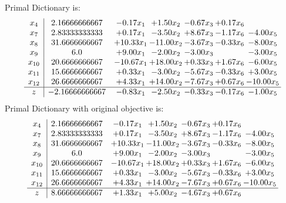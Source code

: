 \documentclass[8pt]{article}
\begin{document}
Primal Dictionary is:
\[\begin{array}{c| c c@{\hskip 2pt} c@{\hskip 2pt} c@{\hskip 2pt} c@{\hskip 2pt} c@{\hskip 2pt} }
 x_{4}   &  2.16666666667 & -0.17 x_{1} & +  1.50 x_{2} & -0.67 x_{3} & +  0.17 x_{6} &   \\
 x_{7}   &  2.83333333333 & +  0.17 x_{1} & -3.50 x_{2} & +  8.67 x_{3} & -1.17 x_{6} & -4.00 x_{5}\\
 x_{8}   &  31.6666666667 & + 10.33 x_{1} & -11.00 x_{2} & -3.67 x_{3} & -0.33 x_{6} & -8.00 x_{5}\\
 x_{9}   &  6.0 & +  9.00 x_{1} & -2.00 x_{2} & -3.00 x_{3} &   & -3.00 x_{5}\\
 x_{10}   &  20.6666666667 & -10.67 x_{1} & + 18.00 x_{2} & +  0.33 x_{3} & +  1.67 x_{6} & -6.00 x_{5}\\
 x_{11}   &  15.6666666667 & +  0.33 x_{1} & -3.00 x_{2} & -5.67 x_{3} & -0.33 x_{6} & +  3.00 x_{5}\\
 x_{12}   &  26.6666666667 & +  4.33 x_{1} & + 14.00 x_{2} & -7.67 x_{3} & +  0.67 x_{6} & -10.00 x_{5}\\
\hline
z    &  -2.16666666667 & -0.83 x_{1} & -2.50 x_{2} & -0.33 x_{3} & -0.17 x_{6} & -1.00 x_{5}\\
\end{array}\]
Primal Dictionary with original objective is:
\[\begin{array}{c| c c@{\hskip 2pt} c@{\hskip 2pt} c@{\hskip 2pt} c@{\hskip 2pt} c@{\hskip 2pt} }
 x_{4}   &  2.16666666667 & -0.17 x_{1} & +  1.50 x_{2} & -0.67 x_{3} & +  0.17 x_{6} &   \\
 x_{7}   &  2.83333333333 & +  0.17 x_{1} & -3.50 x_{2} & +  8.67 x_{3} & -1.17 x_{6} & -4.00 x_{5}\\
 x_{8}   &  31.6666666667 & + 10.33 x_{1} & -11.00 x_{2} & -3.67 x_{3} & -0.33 x_{6} & -8.00 x_{5}\\
 x_{9}   &  6.0 & +  9.00 x_{1} & -2.00 x_{2} & -3.00 x_{3} &   & -3.00 x_{5}\\
 x_{10}   &  20.6666666667 & -10.67 x_{1} & + 18.00 x_{2} & +  0.33 x_{3} & +  1.67 x_{6} & -6.00 x_{5}\\
 x_{11}   &  15.6666666667 & +  0.33 x_{1} & -3.00 x_{2} & -5.67 x_{3} & -0.33 x_{6} & +  3.00 x_{5}\\
 x_{12}   &  26.6666666667 & +  4.33 x_{1} & + 14.00 x_{2} & -7.67 x_{3} & +  0.67 x_{6} & -10.00 x_{5}\\
\hline
z    &  8.66666666667 & +  1.33 x_{1} & +  5.00 x_{2} & -4.67 x_{3} & +  0.67 x_{6} &   \\
\end{array}\]
\end{document}
